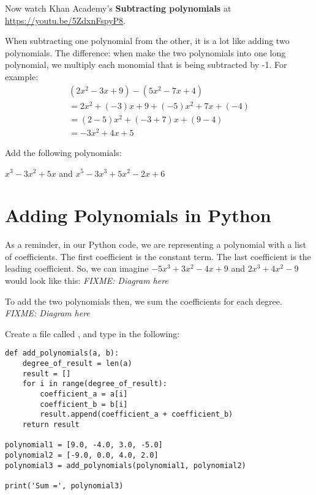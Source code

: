 Now watch Khan Academy's \textbf{Subtracting polynomials} at \url{https://youtu.be/5ZdxnFspyP8}.

When subtracting one polynomial from the other, it is a lot like
adding two polynomials. The difference: when make the two polynomials
into one long polynomial, we multiply each monomial that is being
subtracted by -1. For example:
\begin{multline*}
  (2x^2 - 3x + 9) - (5x^2 - 7x + 4) \\
  = 2x^2 + (-3)x + 9 + (-5)x^2 + 7x + (-4) \\
  = (2 - 5)x^2 + (-3 + 7)x + (9-4) \\
  = -3x^2 + 4x + 5
\end{multline*}

\begin{Exercise}[title=Subtracting Polynomials Practice, label=subtractpns]
  Add the following polynomials:
  \vspace{20mm}
  \vspace{20mm}
\end{Exercise}
\begin{Answer}[ref=subtractpns]$x^3 - 3x^2 + 5x$ and $x^5 - 3x^3 + 5x^2 - 2x + 6$\end{Answer}

\section{Adding Polynomials in Python}

As a reminder, in our Python code, we are representing a polynomial
with a list of coefficients.  The first coefficient is the constant
term. The last coefficient is the leading coefficient. So, we can
imagine $-5x^3 + 3x^2 - 4x + 9$ and $2x^3 +4x^2 - 9$ would look
like this: \textit{FIXME: Diagram here}

To add the two polynomials then, we sum the coefficients for each degree.
\textit{FIXME: Diagram here}

Create a file called , and type in the following: 
\begin{Verbatim}
def add_polynomials(a, b):
    degree_of_result = len(a)
    result = []
    for i in range(degree_of_result):
        coefficient_a = a[i]
        coefficient_b = b[i]
        result.append(coefficient_a + coefficient_b)
    return result

polynomial1 = [9.0, -4.0, 3.0, -5.0]
polynomial2 = [-9.0, 0.0, 4.0, 2.0]
polynomial3 = add_polynomials(polynomial1, polynomial2)

print('Sum =', polynomial3)
\end{Verbatim}

